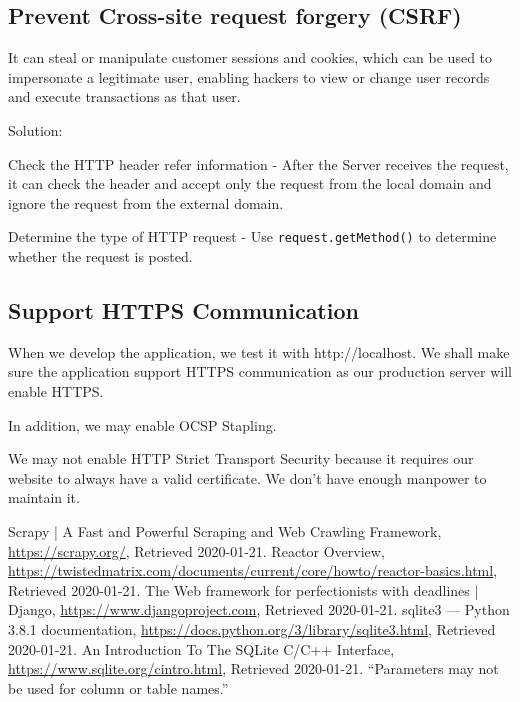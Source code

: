 \documentclass[12pt, a4paper]{article}
\newcommand{\code}[1]{\texttt{#1}}
\begin{document}
\subsection{Prevent Cross-site request forgery (CSRF)}
It can steal or manipulate customer sessions and cookies, which can be used to impersonate a legitimate user, enabling hackers to view or change user records and execute transactions as that user.

Solution: 

Check the HTTP header refer information - After the Server receives the request, it can check the header and accept only the request from the local domain and ignore the request from the external domain.

Determine the type of HTTP request - Use \code{request.getMethod()} to determine whether the request is posted.

\subsection{Support HTTPS Communication}
When we develop the application, we test it with http://localhost. We shall make sure the application support HTTPS communication as our production server will enable HTTPS. 

In addition, we may enable OCSP Stapling. %

We may not enable HTTP Strict Transport Security because it requires our website to always have a valid certificate. We don't have enough manpower to maintain it.



\newcommand{\citeWeb}[3]{#1, \url{#2}, Retrieved #3.}


\begin{thebibliography}{99}
	 \citeWeb{Scrapy | A Fast and Powerful Scraping and Web Crawling Framework}{https://scrapy.org/}{2020-01-21}
	 \citeWeb{Reactor Overview}{https://twistedmatrix.com/documents/current/core/howto/reactor-basics.html}{2020-01-21}
     \citeWeb{The Web framework for perfectionists with deadlines | Django}{https://www.djangoproject.com}{2020-01-21}
     \citeWeb{sqlite3 — Python 3.8.1 documentation}{https://docs.python.org/3/library/sqlite3.html}{2020-01-21}
     \citeWeb{An Introduction To The SQLite C/C++ Interface}{https://www.sqlite.org/cintro.html}{2020-01-21} “Parameters may not be used for column or table names.”
\end{thebibliography}
\end{document}
